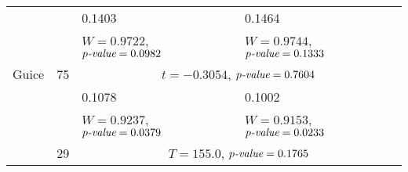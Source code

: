 \begin{table}[]
\begin{adjustbox}{center}
\begin{tabular}{llll}
 &  & 0.1403 & 0.1464 \\
 &  & $W = 0.9722$, $p\emph{-value} = 0.0982$ & $W = 0.9744$, $p\emph{-value} = 0.1333$ \\
\multirow{-3}{*}{Guice} & \multirow{-3}{*}{75} & \multicolumn{2}{c}{$t = -0.3054$, $p\emph{-value} = 0.7604$} \\
\rowcolor{Gray}
\cellcolor{Gray} & \cellcolor{Gray} & 0.1078 & 0.1002 \\
\rowcolor{Gray}
\cellcolor{Gray} & \cellcolor{Gray} & $W = 0.9237$, $p\emph{-value} = 0.0379$ & $W = 0.9153$, $p\emph{-value} = 0.0233$ \\
\rowcolor{Gray}
\multirow{-3}{*}{\cellcolor{Gray}Jsoup} & \multirow{-3}{*}{\cellcolor{Gray}29} & \multicolumn{2}{c}{\cellcolor{Gray}$T = 155.0$, $p\emph{-value} = 0.1765$}\\
\bottomrule
\end{tabular}
\end{adjustbox}
\end{table}








